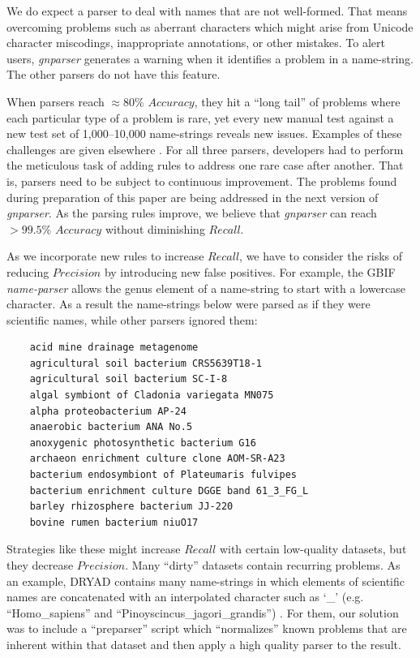 \documentclass{bmcart}
\begin{document}
\vspace{0.5cm}

We do expect a parser to deal with names that are not well-formed. That means
overcoming problems such as aberrant characters which might arise from Unicode
character miscodings, inappropriate annotations, or other mistakes. To alert
users, \textit{gnparser} generates a warning when it identifies a problem in a
name-string. The other parsers do not have this feature.

When parsers reach $\approx80\%$ $Accuracy$, they hit a ``long tail'' of
problems where each particular type of a problem is rare, yet every new manual
test against a new test set of 1,000--10,000 name-strings reveals new issues.
Examples of these challenges are given elsewhere \cite{Patterson2016}.
For all three parsers, developers had to perform the meticulous task of adding
rules to address one rare case after another. That is, parsers need to be
subject to continuous improvement. The problems found during preparation of
this paper are being addressed in the next version of \textit{gnparser}. As the
parsing rules improve, we believe that \textit{gnparser} can reach $>99.5\%$
$Accuracy$ without diminishing $Recall$.

As we incorporate new rules to increase $Recall$, we have to consider the risks
of reducing $Precision$ by introducing new false positives. For example, the
GBIF \textit{name-parser} allows the genus element of a name-string to start
with a lowercase character. As a result the name-strings below were parsed as
if they were scientific names, while other parsers ignored them:

\vspace{0.5cm}

\begin{verbatim}
    acid mine drainage metagenome
    agricultural soil bacterium CRS5639T18-1
    agricultural soil bacterium SC-I-8
    algal symbiont of Cladonia variegata MN075
    alpha proteobacterium AP-24
    anaerobic bacterium ANA No.5
    anoxygenic photosynthetic bacterium G16
    archaeon enrichment culture clone AOM-SR-A23
    bacterium endosymbiont of Plateumaris fulvipes
    bacterium enrichment culture DGGE band 61_3_FG_L
    barley rhizosphere bacterium JJ-220
    bovine rumen bacterium niuO17
\end{verbatim}

\vspace{0.5cm}

Strategies like these might increase $Recall$ with certain low-quality
datasets, but they decrease $Precision$. Many ``dirty'' datasets contain
recurring problems. As an example, DRYAD contains many name-strings in which
elements of scientific names are concatenated with an interpolated character
such as `\_’ (e.g. ``Homo\_sapiens'' and ``Pinoyscincus\_jagori\_grandis'')
\cite{Patterson2016}. For them, our solution was to include a
``preparser'' script which ``normalizes'' known problems that are inherent
within that dataset and then apply a high quality parser to the result.
\end{document}
